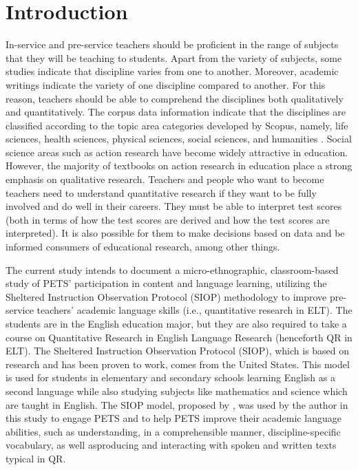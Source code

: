 \documentclass[english]{textolivre}
\begin{document}
\begin{polyabstract}
\begin{portuguese}
\begin{abstract}
\end{abstract}
\end{portuguese}
\end{polyabstract}

\section{Introduction}\label{sec-intro}
In-service and pre-service teachers should be proficient in the range of subjects that they will be teaching to students. Apart from the variety of subjects, some studies indicate that discipline varies from one to another. Moreover, academic writings indicate the variety of one discipline compared to another. For this reason, teachers should be able to comprehend the disciplines both qualitatively and quantitatively. The corpus data information indicate that the disciplines are classified according to the topic area categories developed by Scopus, namely, life sciences, health sciences, physical sciences, social sciences, and humanities \cite{kwary_corpus_2019}. Social science areas such as action research have become widely attractive in education. However, the majority of textbooks on action research in education place a strong emphasis on qualitative research. Teachers and people who want to become teachers need to understand quantitative research if they want to be fully involved and do well in their careers. They must be able to interpret test scores (both in terms of how the test scores are derived and how the test scores are interpreted). It is also possible for them to make decisions based on data and be informed consumers of educational research, among other things.

The current study intends to document a micro-ethnographic, classroom-based study of PETS' participation in content and language learning, utilizing the Sheltered Instruction Observation Protocol (SIOP) methodology to improve pre-service teachers’ academic language skills (i.e., quantitative research in ELT). The students are in the English education major, but they are also required to take a course on Quantitative Research in English Language Research (henceforth QR in ELT). The Sheltered Instruction Observation Protocol (SIOP), which is based on research and has been proven to work, comes from the United States. This model is used for students in elementary and secondary schools learning English as a second language while also studying subjects like mathematics and science which are taught in English. The SIOP model, proposed by \textcite{echevarria_making_2017}, was used by the author in this study to engage PETS and to help PETS improve their academic language abilities, such as understanding, in a comprehensible manner, discipline-specific vocabulary, as well asproducing and interacting with  spoken and written texts typical in QR.
\end{document}
